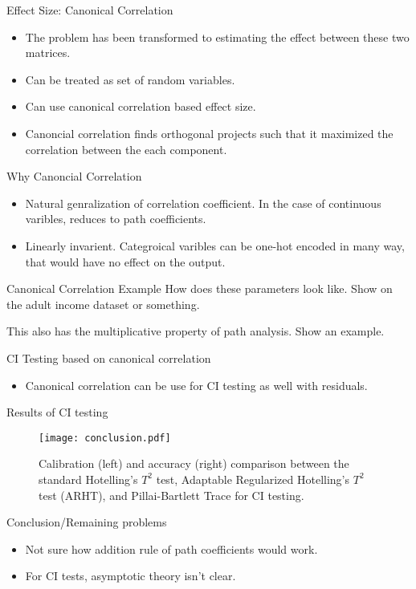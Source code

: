 \documentclass{beamer}
\begin{document}
\begin{frame}{Effect Size: Canonical Correlation}
	\begin{itemize}
		\item The problem has been transformed to estimating the effect between these two matrices.
		\item Can be treated as set of random variables. 
		\item Can use canonical correlation based effect size.
		\item Canoncial correlation finds orthogonal projects such that
			it maximized the correlation between the each
			component.
	\end{itemize}

\end{frame}

\begin{frame}{Why Canoncial Correlation}
	\begin{itemize}
		\item Natural genralization of correlation coefficient. In the case of continuous varibles, reduces to path coefficients.
		\item Linearly invarient. Categroical varibles can be one-hot encoded in many way, that would have no effect on the output.
	\end{itemize}
\end{frame}

\begin{frame}{Canonical Correlation Example}
	How does these parameters look like. Show on the adult income dataset
	or something.

	This also has the multiplicative property of path analysis. Show an
	example.
\end{frame}

\begin{frame}{CI Testing based on canonical correlation}
	\begin{itemize}
		\item Canonical correlation can be use for CI testing as well with residuals.

	\end{itemize}	
\end{frame}

\begin{frame}{Results of CI testing}
	\begin{figure}
		\centering
		\texttt{[image: conclusion.pdf]}
		\caption{Calibration (left) and accuracy (right) comparison between the
		standard Hotelling's $ T^2 $ test, Adaptable Regularized Hotelling's $
		T^2 $ test (ARHT), and Pillai-Bartlett Trace for CI testing.}
		\label{fig:conc_compare}
	\end{figure}

\end{frame}

\begin{frame}{Conclusion/Remaining problems}
	\begin{itemize}
		\item Not sure how addition rule of path coefficients would work.
		\item For CI tests, asymptotic theory isn't clear.
	\end{itemize}
\end{frame}
\end{document}
